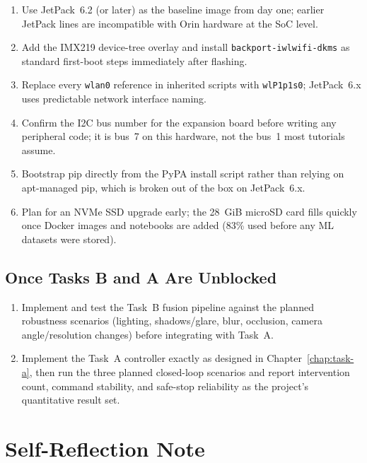 \documentclass{imc-inf}
\begin{document}
\begin{enumerate}
\item Use JetPack~6.2 (or later) as the baseline image from day one; earlier
JetPack lines are incompatible with Orin hardware at the SoC level.
\item Add the IMX219 device-tree overlay and install \texttt{backport-iwlwifi-dkms}
as standard first-boot steps immediately after flashing.
\item Replace every \texttt{wlan0} reference in inherited scripts with
\texttt{wlP1p1s0}; JetPack~6.x uses predictable network interface naming.
\item Confirm the I2C bus number for the expansion board before writing any
peripheral code; it is bus~7 on this hardware, not the bus~1 most tutorials
assume.
\item Bootstrap pip directly from the PyPA install script rather than relying on
apt-managed pip, which is broken out of the box on JetPack~6.x.
\item Plan for an NVMe SSD upgrade early; the 28~GiB microSD card fills quickly
once Docker images and notebooks are added (83\% used before any ML datasets were
stored).
\end{enumerate}

\section{Once Tasks B and A Are Unblocked}
\label{sec:when-unblocked}

\begin{enumerate}
\item Implement and test the Task~B fusion pipeline against the planned robustness
scenarios (lighting, shadows/glare, blur, occlusion, camera angle/resolution
changes) before integrating with Task~A.
\item Implement the Task~A controller exactly as designed in
Chapter~\ref{chap:task-a}, then run the three planned closed-loop scenarios and
report intervention count, command stability, and safe-stop reliability as the
project's quantitative result set.
\end{enumerate}

\chapter{Self-Reflection Note}
\label{chap:self-reflection}
\end{document}
